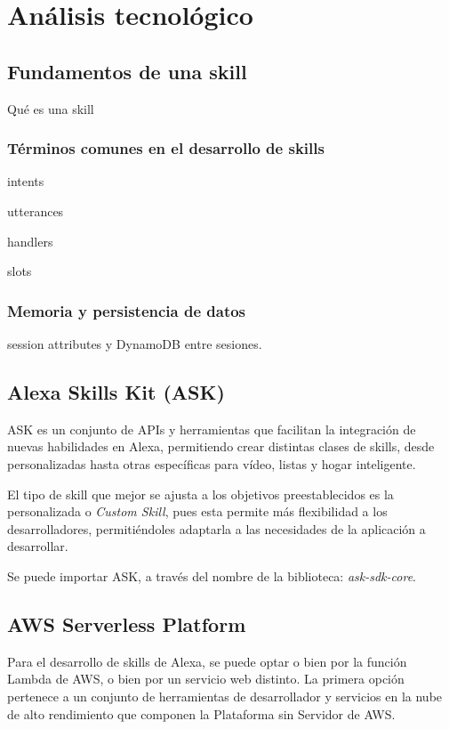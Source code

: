 \section{Análisis tecnológico}


\subsection{Fundamentos de una skill}

Qué es una skill

\subsubsection{Términos comunes en el desarrollo de skills}

intents

utterances

handlers 

slots

\subsubsection{Memoria y persistencia de datos}

session attributes y DynamoDB entre sesiones.

\subsection{Alexa Skills Kit (ASK)}

ASK es un conjunto de APIs y herramientas que facilitan la integración de nuevas habilidades en Alexa, permitiendo crear distintas clases de skills, desde personalizadas hasta otras específicas para vídeo, listas y hogar inteligente.

El tipo de skill que mejor se ajusta a los objetivos preestablecidos es la personalizada o \textit{Custom Skill}, pues esta permite más flexibilidad a los desarrolladores, permitiéndoles adaptarla a las necesidades de la aplicación a desarrollar.

Se puede importar ASK, a través del nombre de la biblioteca: \textit{ask-sdk-core}.

\subsection{AWS Serverless Platform}

Para el desarrollo de skills de Alexa, se puede optar o bien por la función Lambda de AWS, o bien por un servicio web distinto. La primera opción pertenece a un conjunto de herramientas de desarrollador y servicios en la nube de alto rendimiento que componen la Plataforma sin Servidor de AWS.

